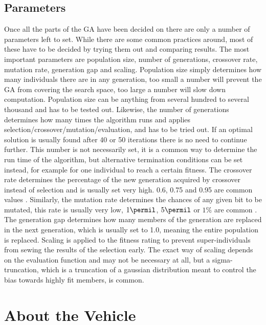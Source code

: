 \subsection{Parameters}
\label{sec:parameters}

Once all the parts of the GA have been decided on there are only a number of parameters left to set. While there are some common practices around, most of these have to be decided by trying them out and comparing results. The most important parameters are population size, number of generations, crossover rate, mutation rate, generation gap and scaling. Population size simply determines how many individuals there are in any generation, too small a number will prevent the GA from covering the search space, too large a number will slow down computation. Population size can be anything from several hundred to several thousand and has to be tested out. Likewise, the number of generations determines how many times the algorithm runs and applies selection/crossover/mutation/evaluation, and has to be tried out. If an optimal solution is usually found after 40 or 50 iterations there is no need to continue further. This number is not necessarily set, it is a common way to determine the run time of the algorithm, but alternative termination conditions can be set instead, for example for one individual to reach a certain fitness. The crossover rate determines the percentage of the new generation acquired by crossover instead of selection and is usually set very high. 0.6, 0.75 and 0.95 are common values \cite{20, 22,24}. Similarly, the mutation rate determines the chances of any given bit to be mutated, this rate is usually very low, $1\permil$, $5\permil$ or $1\%$ are common \cite{20,23,24}. The generation gap determines how many members of the generation are replaced in the next generation, which is usually set to 1.0, meaning the entire population is replaced. Scaling is applied to the fitness rating to prevent super-individuals from sewing the results of the selection early. The exact way of scaling depends on the evaluation function and may not be necessary at all, but a sigma-truncation, which is a truncation of a gaussian distribution meant to control the bias towards highly fit members, is common. \cite{26}

\section{About the Vehicle}
\label{sec:previous_knowledge_vehicle}

